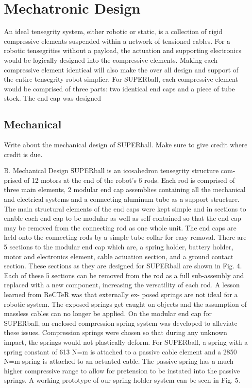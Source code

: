 \chapter{Mechatronic Design}

An ideal tensegrity system, either robotic or static, is a collection of rigid compressive elements suspended within a network of tensioned cables. 
For a robotic tensegrities without a payload, the actuation and supporting electronics would be logically designed into the compressive elements. 
Making each compressive element identical will also make the over all design and support of the entire tensegrity robot simplier. 
For SUPERball, each compressive element would be comprised of three parts: two identical end caps and a piece of tube stock. 
The end cap was designed 

\section{Mechanical}
Write about the mechanical design of SUPERball. Make sure to give credit where credit is due.

B.  Mechanical Design
SUPERball  is  an  icosahedron  tensegrity  structure  com-
prised  of  12  motors  at  the  end  of  the  robot’s  6  rods.  Each
rod  is  comprised  of  three  main  elements,  2  modular  end
cap  assemblies  containing  all  the  mechanical  and  electrical
systems   and   a   connecting   aluminum   tube   as   a   support
structure. The main structural elements of the end caps were
kept  simple  and  in  sections  to  enable  each  end  cap  to  be
modular  as  well  as  self  contained  so  that  the  end  cap  may
be removed from the connecting rod as one whole unit. The
end  caps  are  held  onto  the  connecting  rods  by  a  simple
tube  collar  for  easy  removal.  There  are  5  sections  to  the
modular end cap which are, a spring holder, battery holder,
motor and electronics element, cable actuation section, and a
ground contact section. These sections as they are designed
for SUPERball are shown in Fig. 4. Each of these 5 sections
can  be  removed  from  the  rod  as  a  full  sub-assembly  and
replaced with a new component, increasing the versatility of
each rod.
A  lesson  learned  from  ReCTeR  was  that  externally  ex-
posed springs are not ideal for a robotic system. The exposed
springs get caught on objects and the assumption of massless
cables  can  no  longer  be  applied.  On  the  modular  end  cap
for SUPERball, an enclosed compression spring system was
developed  to  alleviate  these  issues.  Compression  springs
were chosen so that during any unknown impact, the springs
would not plastically deform. For SUPERball, a spring with
a spring constant of
613
N=m
is attached to a passive cable
element  and  a
2850
N=m
spring  is  attached  to  an  actuated
cable.  The  passive  spring  has  a  much  higher  compressive
range to allow for pretension to be instated into the passive
springs.  A  working  prototype  of  our  spring  holder  system
can be seen in Fig. 5.

